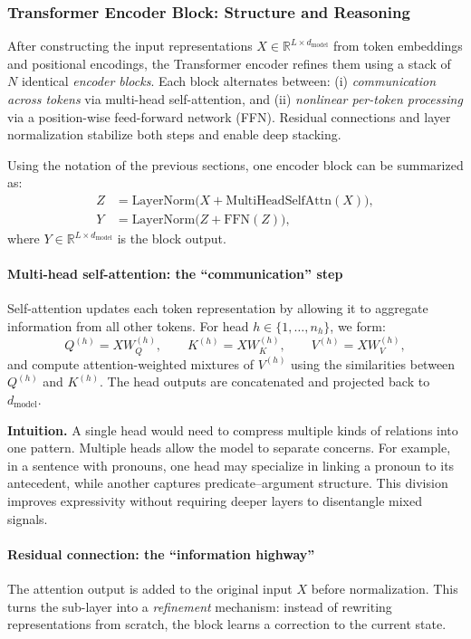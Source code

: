 \subsubsection{Transformer Encoder Block: Structure and Reasoning}

\noindent
After constructing the input representations
\(
X \in \mathbb{R}^{L \times d_{\text{model}}}
\)
from token embeddings and positional encodings,
the Transformer encoder refines them using a stack of \(N\) identical \emph{encoder blocks}.
Each block alternates between:
(i) \emph{communication across tokens} via multi-head self-attention,
and
(ii) \emph{nonlinear per-token processing} via a position-wise feed-forward network (FFN).
Residual connections and layer normalization stabilize both steps and enable deep stacking.

\noindent
Using the notation of the previous sections, one encoder block can be summarized as:
\begin{align}
	Z &= \text{LayerNorm}\!\bigl(X + \text{MultiHeadSelfAttn}(X)\bigr), \\
	Y &= \text{LayerNorm}\!\bigl(Z + \text{FFN}(Z)\bigr),
\end{align}
where \(Y \in \mathbb{R}^{L \times d_{\text{model}}}\) is the block output.

\paragraph{Multi-head self-attention: the ``communication'' step}
\noindent
Self-attention updates each token representation by allowing it to aggregate information from all other tokens.
For head \(h \in \{1,\dots,n_h\}\), we form:
\[
Q^{(h)} = XW_Q^{(h)}, 
\qquad
K^{(h)} = XW_K^{(h)}, 
\qquad
V^{(h)} = XW_V^{(h)},
\]
and compute attention-weighted mixtures of \(V^{(h)}\) using the similarities between \(Q^{(h)}\) and \(K^{(h)}\).
The head outputs are concatenated and projected back to \(d_{\text{model}}\).

\noindent
\textbf{Intuition.}
A single head would need to compress multiple kinds of relations into one pattern.
Multiple heads allow the model to separate concerns.
For example, in a sentence with pronouns,
one head may specialize in linking a pronoun to its antecedent,
while another captures predicate--argument structure.
This division improves expressivity without requiring deeper layers to disentangle mixed signals.

\paragraph{Residual connection: the ``information highway''}
\noindent
The attention output is added to the original input \(X\) before normalization.
This turns the sub-layer into a \emph{refinement} mechanism:
instead of rewriting representations from scratch,
the block learns a correction to the current state.

